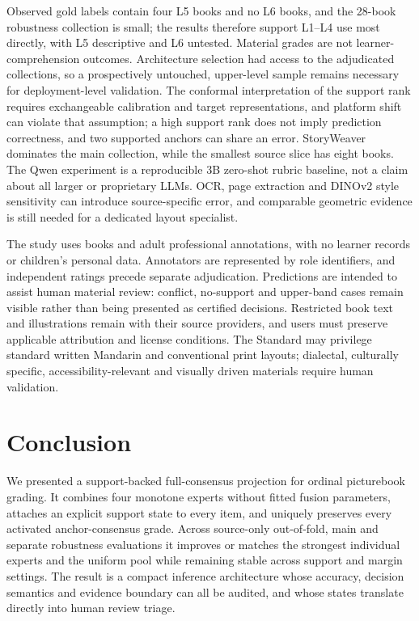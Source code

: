 \documentclass[conference]{IEEEtran}
\begin{document}
Observed gold labels contain four L5 books and no L6 books, and the 28-book
robustness collection is small; the results therefore support L1--L4 use most
directly, with L5 descriptive and L6 untested. Material grades are not
learner-comprehension outcomes. Architecture selection had access to the
adjudicated collections, so a prospectively untouched, upper-level sample
remains necessary for deployment-level validation. The conformal interpretation
of the support rank requires exchangeable calibration and target
representations, and platform shift can violate that assumption; a high support
rank does not imply prediction correctness, and two supported anchors can share
an error. StoryWeaver dominates the main collection, while the smallest source
slice has eight books. The Qwen experiment is a reproducible 3B zero-shot
rubric baseline, not a claim about all larger or proprietary LLMs. OCR, page
extraction and DINOv2 style sensitivity can introduce source-specific error,
and comparable geometric evidence is still needed for a dedicated layout
specialist.

The study uses books and adult professional annotations, with no learner records
or children's personal data. Annotators are represented by role identifiers,
and independent ratings precede separate adjudication. Predictions are intended
to assist human material review: conflict, no-support and upper-band cases
remain visible rather than being presented as certified decisions. Restricted
book text and illustrations remain with their source providers, and users must
preserve applicable attribution and license conditions. The Standard may
privilege standard written Mandarin and conventional print layouts; dialectal,
culturally specific, accessibility-relevant and visually driven materials
require human validation.

\section{Conclusion}

We presented a support-backed full-consensus projection for ordinal picturebook
grading. It combines four monotone experts without fitted fusion parameters,
attaches an explicit support state to every item, and uniquely preserves every
activated anchor-consensus grade. Across source-only out-of-fold, main and
separate robustness evaluations it improves or matches the strongest individual
experts and the uniform pool while remaining stable across support and margin
settings.
The result is a compact inference architecture whose accuracy, decision
semantics and evidence boundary can all be audited, and whose states translate
directly into human review triage.
\end{document}
